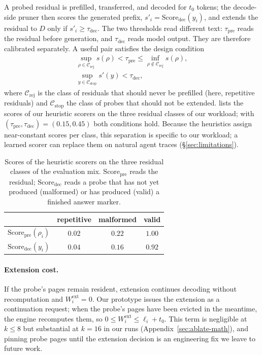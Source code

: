 A probed residual is prefilled, transferred, and decoded for $t_0$ tokens; the decode-side pruner then scores the generated prefix, $s'_i=\mathrm{Score}_{\mathrm{dec}}(y_i)$, and extends the residual to $D$ only if $s'_i\ge\tau_{\mathrm{dec}}$.
The two thresholds read different text: $\tau_{\mathrm{pre}}$ reads the residual before generation, and $\tau_{\mathrm{dec}}$ reads model output.
They are therefore calibrated separately.
A useful pair satisfies the design condition
\begin{gather}
\sup_{\rho\in\mathcal{C}_{\mathrm{rej}}}s(\rho)<\tau_{\mathrm{pre}}\le\inf_{\rho\notin\mathcal{C}_{\mathrm{rej}}}s(\rho), \label{eq:sep-pre}\\
\sup_{y\in\mathcal{C}_{\mathrm{stop}}}s'(y)<\tau_{\mathrm{dec}}, \nonumber
\end{gather}
where $\mathcal{C}_{\mathrm{rej}}$ is the class of residuals that should never be prefilled (here, repetitive residuals) and $\mathcal{C}_{\mathrm{stop}}$ the class of probes that should not be extended.
 lists the scores of our heuristic scorers on the three residual classes of our workload; with $(\tau_{\mathrm{pre}},\tau_{\mathrm{dec}})=(0.15,0.45)$ both conditions hold.
Because the heuristics assign near-constant scores per class, this separation is specific to our workload; a learned scorer can replace them on natural agent traces (\S\ref{sec:limitations}).

\begin{table}[t]
\centering
\caption{Scores of the heuristic scorers on the three residual classes of the evaluation mix.
$\mathrm{Score}_{\mathrm{pre}}$ reads the residual; $\mathrm{Score}_{\mathrm{dec}}$ reads a probe that has not yet produced (malformed) or has produced (valid) a finished answer marker.}
\label{tab:scores}
\scriptsize
\setlength{\tabcolsep}{4pt}
\begin{tabular}{@{}lccc@{}}
\toprule
 & repetitive & malformed & valid \\
\midrule
$\mathrm{Score}_{\mathrm{pre}}(\rho_i)$ & $0.02$ & $0.22$ & $1.00$ \\
$\mathrm{Score}_{\mathrm{dec}}(y_i)$ & $0.04$ & $0.16$ & $0.92$ \\
\bottomrule
\end{tabular}
\end{table}

\paragraph{Extension cost.}
If the probe's pages remain resident, extension continues decoding without recomputation and $W_i^{\mathrm{ext}}{=}0$.
Our prototype issues the extension as a continuation request; when the probe's pages have been evicted in the meantime, the engine recomputes them, so $0\le W_i^{\mathrm{ext}}\le\ell_i+t_0$.
This term is negligible at $k\le 8$ but substantial at $k{=}16$ in our runs (Appendix~\ref{sec:ablate-math}), and pinning probe pages until the extension decision is an engineering fix we leave to future work.

